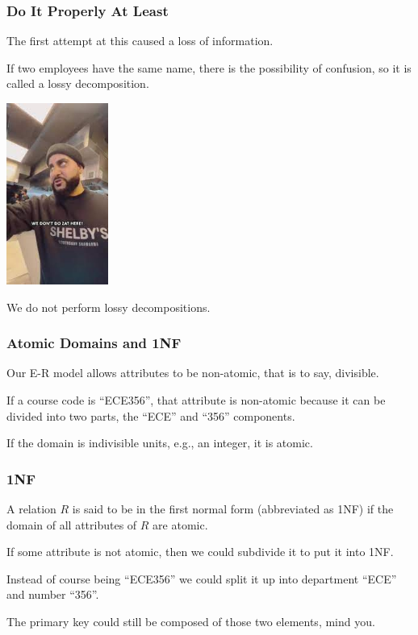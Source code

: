 \begin{frame}
\frametitle{Do It Properly At Least}


The first attempt at this caused a loss of information.

If two employees have the same name, there is the possibility of confusion, so it is called a \alert{lossy} decomposition. 

\begin{center}
	\includegraphics[width=0.25\textwidth]{images/dont-do.jpg}
\end{center}

We do not perform lossy decompositions.

\end{frame}


\begin{frame}
\frametitle{Atomic Domains and 1NF}

Our E-R model allows attributes to be non-atomic, that is to say, divisible. 

If a course code is ``ECE356'', that attribute is non-atomic because it can be divided into two parts, the ``ECE'' and ``356'' components. 

If the domain is indivisible units, e.g., an integer, it is atomic.

\end{frame}



\begin{frame}
\frametitle{1NF}

A relation $R$ is said to be in the \alert{first normal form} (abbreviated as 1NF) if the domain of all attributes of $R$ are atomic. 

If some attribute is not atomic, then we could subdivide it to put it into 1NF. 

Instead of course being ``ECE356'' we could split  it up into department ``ECE'' and number ``356''. 

The primary key could still be composed of those two elements, mind you.


\end{frame}



